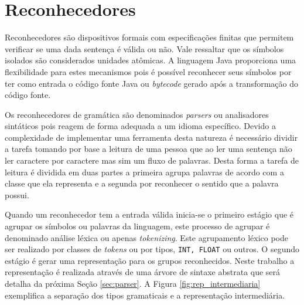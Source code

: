 \section{Reconhecedores}\label{sec:rec}

Reconhecedores são dispositivos formais com especificações finitas que permitem verificar se uma dada sentença é válida ou não. Vale ressaltar que os símbolos isolados são considerados unidades atômicas. A linguagem Java proporciona uma flexibilidade para estes mecanismos pois é possível reconhecer seus símbolos por ter como entrada o código fonte Java ou \textit{bytecode} gerado após a transformação do código fonte.

Os reconhecedores de gramática são denominados \textit{parsers} ou analisadores sintáticos pois reagem de forma adequada a um idioma específico. Devido a complexidade de implementar uma ferramenta desta natureza é necessário dividir a tarefa tomando por base a leitura de uma pessoa que ao ler uma sentença não ler caractere por caractere mas sim um fluxo de palavras. Desta forma a tarefa de leitura é dividida em duas partes a primeira agrupa palavras de acordo com a classe que ela representa e a segunda por reconhecer o sentido que a palavra possui. 

Quando um reconhecedor tem a entrada válida inicia-se o primeiro estágio que é agrupar os símbolos ou palavras da linguagem, este processo de agrupar é denominado análise léxica ou apenas \textit{tokenizing}. Este agrupamento léxico pode ser realizado por classes de \textit{tokens} ou por tipos, \texttt{INT, FLOAT} ou outros. O segundo estágio é gerar uma representação para os grupos reconhecidos. Neste trabalho a representação é realizada através de uma árvore de sintaxe abstrata que será detalha da próxima Seção \ref{sec:parser}. A Figura \ref{fig:rep_intermediaria} exemplifica a separação dos tipos gramaticais e a representação intermediária.



